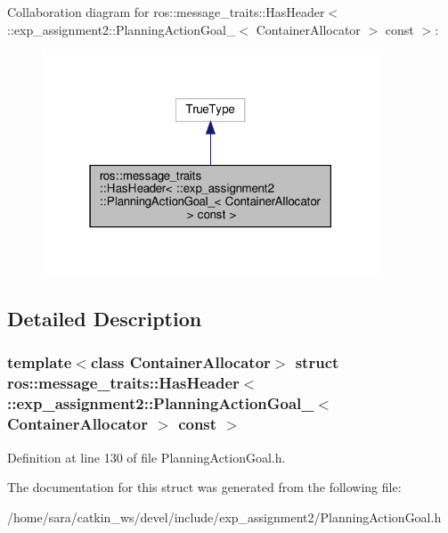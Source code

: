 Collaboration diagram for ros\+:\+:message\+\_\+traits\+:\+:Has\+Header$<$ \+:\+:exp\+\_\+assignment2\+:\+:Planning\+Action\+Goal\+\_\+$<$ Container\+Allocator $>$ const $>$\+:
\nopagebreak
\begin{figure}[H]
\begin{center}
\leavevmode
\includegraphics[width=283pt]{structros_1_1message__traits_1_1HasHeader_3_01_1_1exp__assignment2_1_1PlanningActionGoal___3_01Ce5489da57327a191b48d24ab8c448564}
\end{center}
\end{figure}


\subsection{Detailed Description}
\subsubsection*{template$<$class Container\+Allocator$>$\newline
struct ros\+::message\+\_\+traits\+::\+Has\+Header$<$ \+::exp\+\_\+assignment2\+::\+Planning\+Action\+Goal\+\_\+$<$ Container\+Allocator $>$ const $>$}



Definition at line 130 of file Planning\+Action\+Goal.\+h.



The documentation for this struct was generated from the following file\+:\begin{DoxyCompactItemize}
\item 
/home/sara/catkin\+\_\+ws/devel/include/exp\+\_\+assignment2/Planning\+Action\+Goal.\+h\end{DoxyCompactItemize}
